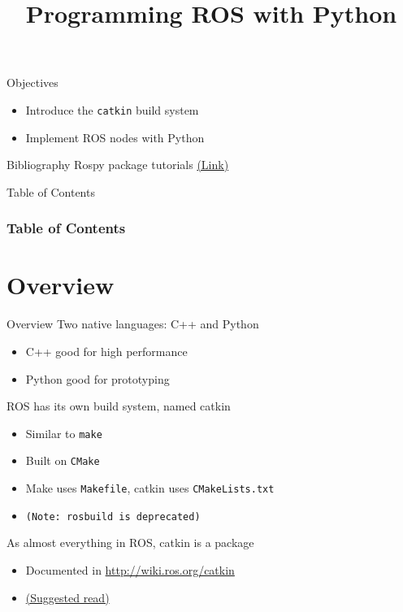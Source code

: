 \documentclass[10pt,compress]{beamer} %
\title[Programming ROS with Python]{Programming ROS with Python}
\author{}
\institute{\asignatura}
\date{}
\begin{document}
{\titlepageBlue
    \begin{frame}
        \titlepage
    \end{frame}
}

\begin{frame}[plain]{}
   \begin{block}{Objectives}
       \begin{itemize}
	   	\item Introduce the \texttt{catkin} build system
       	\item Implement ROS nodes with Python
       \end{itemize}
   \end{block}

   \begin{block}{Bibliography}
       Rospy package tutorials \href{http://wiki.ros.org/rospy/Tutorials}{(Link)}
   \end{block}

\end{frame}

{
\begin{frame}[shrink]{Table of Contents}
 \frametitle{Table of Contents}
 \tableofcontents
\end{frame}
}

\section{Overview}

\begin{frame}{Overview}
	Two native languages: C++ and Python
	\begin{itemize}
		\item C++ good for high performance
		\item Python good for prototyping
  	\end{itemize}
	ROS has its own build system, named \alert{catkin}
	\begin{itemize}
		\item Similar to \texttt{make}
		\item Built on \texttt{CMake}
		\item Make uses \texttt{Makefile}, catkin uses \texttt{CMakeLists.txt}
		\item[] \texttt{(Note: \texttt{rosbuild} is deprecated)}
  	\end{itemize}
	As almost everything in ROS, catkin is a package
	\begin{itemize}
		\item Documented in \url{http://wiki.ros.org/catkin}
		\item \href{http://wiki.ros.org/catkin/conceptual\_overview}{(Suggested read)}
	\end{itemize}
\end{frame}
\end{document}
